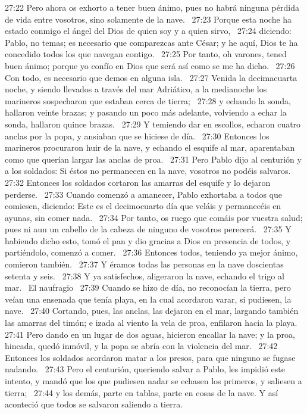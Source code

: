 27:22 Pero ahora os exhorto a tener buen ánimo, pues no habrá ninguna pérdida de vida entre vosotros, sino solamente de la nave.  
27:23 Porque esta noche ha estado conmigo el ángel del Dios de quien soy y a quien sirvo,  
27:24 diciendo: Pablo, no temas; es necesario que comparezcas ante César; y he aquí, Dios te ha concedido todos los que navegan contigo.  
27:25 Por tanto, oh varones, tened buen ánimo; porque yo confío en Dios que será así como se me ha dicho.  
27:26 Con todo, es necesario que demos en alguna isla.  
27:27 Venida la decimacuarta noche, y siendo llevados a través del mar Adriático, a la medianoche los marineros sospecharon que estaban cerca de tierra;  
27:28 y echando la sonda, hallaron veinte brazas; y pasando un poco más adelante, volviendo a echar la sonda, hallaron quince brazas.  
27:29 Y temiendo dar en escollos, echaron cuatro anclas por la popa, y ansiaban que se hiciese de día.  
27:30 Entonces los marineros procuraron huir de la nave, y echando el esquife al mar, aparentaban como que querían largar las anclas de proa.  
27:31 Pero Pablo dijo al centurión y a los soldados: Si éstos no permanecen en la nave, vosotros no podéis salvaros.  
27:32 Entonces los soldados cortaron las amarras del esquife y lo dejaron perderse.  
27:33 Cuando comenzó a amanecer, Pablo exhortaba a todos que comiesen, diciendo: Este es el decimocuarto día que veláis y permanecéis en ayunas, sin comer nada.  
27:34 Por tanto, os ruego que comáis por vuestra salud; pues ni aun un cabello de la cabeza de ninguno de vosotros perecerá.  
27:35 Y habiendo dicho esto, tomó el pan y dio gracias a Dios en presencia de todos, y partiéndolo, comenzó a comer.  
27:36 Entonces todos, teniendo ya mejor ánimo, comieron también.  
27:37 Y éramos todas las personas en la nave doscientas setenta y seis.  
27:38 Y ya satisfechos, aligeraron la nave, echando el trigo al mar.  
El naufragio  
27:39 Cuando se hizo de día, no reconocían la tierra, pero veían una ensenada que tenía playa, en la cual acordaron varar, si pudiesen, la nave.  
27:40 Cortando, pues, las anclas, las dejaron en el mar, largando también las amarras del timón; e izada al viento la vela de proa, enfilaron hacia la playa.  
27:41 Pero dando en un lugar de dos aguas, hicieron encallar la nave; y la proa, hincada, quedó inmóvil, y la popa se abría con la violencia del mar.  
27:42 Entonces los soldados acordaron matar a los presos, para que ninguno se fugase nadando.  
27:43 Pero el centurión, queriendo salvar a Pablo, les impidió este intento, y mandó que los que pudiesen nadar se echasen los primeros, y saliesen a tierra;  
27:44 y los demás, parte en tablas, parte en cosas de la nave. Y así aconteció que todos se salvaron saliendo a tierra.  
